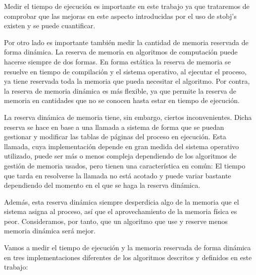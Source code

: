 \documentclass[a4paper,10pt]{article}
\begin{document}
Medir el tiempo de ejecución es importante en este trabajo ya que trataremos de comprobar que las mejoras en este aspecto introducidas por el uso de stobj's existen y se puede cuantificar.

\par \vspace{10pt}

Por otro lado es importante también medir la cantidad de memoria reservada de forma dinámica. La reserva de memoria en algoritmos de computación puede hacerse siempre de dos formas. En forma estática la reserva de memoria se resuelve en tiempo de compilación y el sistema operativo, al ejecutar el proceso, ya tiene reservada toda la memoria que pueda necesitar el algoritmo. Por contra, la reserva de memoria dinámica es más flexible, ya que permite la reserva de memoria en cantidades que no se conocen hasta estar en tiempo de ejecución. 

\par \vspace{10pt}

La reserva dinámica de memoria tiene, sin embargo, ciertos inconvenientes. Dicha reserva se hace en base a una llamada a sistema de forma que se puedan gestionar y modificar las tablas de páginas del proceso en ejecución. Esta llamada, cuya implementación depende en gran medida del sistema operativo utilizado, puede ser más o menos compleja dependiendo de los algoritmos de gestión de memoria usados, pero tienen una característica en común: El tiempo que tarda en resolverse la llamada no está acotado y puede variar bastante dependiendo del momento en el que se haga la reserva dinámica. 

\par \vspace{10pt}

Además, esta reserva dinámica siempre desperdicia algo de la memoria que el sistema asigna al proceso, así que el aprovechamiento de la memoria física es peor. Consideramos, por tanto, que un algoritmo que use y reserve menos memoria dinámica será mejor.

\par \vspace{10pt}

Vamos a medir el tiempo de ejecución y la memoria reservada de forma dinámica en tres implementaciones diferentes de los algoritmos descritos y definidos en este trabajo:

\par \vspace{10pt}
\end{document}
